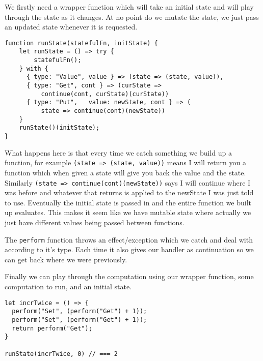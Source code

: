We firstly need a wrapper function which will
take an initial state and will play through
the state as it changes. At no point
do we mutate the state, we just pass an updated
state whenever it is requested.
\begin{verbatim}
function runState(statefulFn, initState) {
    let runState = () => try {
        statefulFn();
    } with {
      { type: "Value", value } => (state => (state, value)),
      { type: "Get", cont } => (curState =>
          continue(cont, curState)(curState))
      { type: "Put",   value: newState, cont } => (
          state => continue(cont)(newState))
    }
    runState()(initState);
}
\end{verbatim}
What happens here is that every time we catch something we build up a function,
for example \texttt{(state => (state, value))} means I will return
you a function which when given a state will give you back the value
and the state.
Similarly \texttt{(state => continue(cont)(newState))}
says I will continue where I was before and whatever that returns
is applied to the newState I was just told to use.
Eventually the initial state is passed in
and the entire function we built up evaluates.
This makes it seem like we have mutable state
where actually we just have different values
being passed between functions.

The \texttt{perform} function throws an effect/exception
which we catch and deal with according to it's type.
Each time it also gives our handler as continuation
so we can get back where we were previously.

Finally we can play through the computation
using our wrapper function,
some computation to run,
and an initial state.
\begin{verbatim}
let incrTwice = () => {
  perform("Set", (perform("Get") + 1));
  perform("Set", (perform("Get") + 1));
  return perform("Get");
}

runState(incrTwice, 0) // === 2
\end{verbatim}

